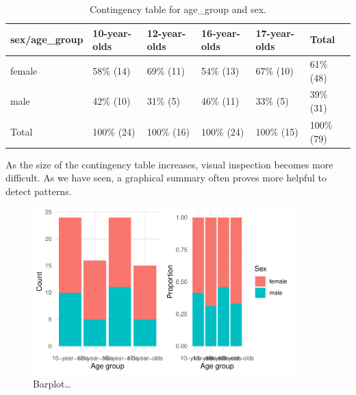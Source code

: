 \documentclass[
  letterpaper,
]{latex/krantz}
\begin{document}
\hypertarget{tbl-summaries-bivariate-categorical-table-belc}{}
\begin{table}
\caption{\label{tbl-summaries-bivariate-categorical-table-belc}Contingency table for age\_group and sex. }\tabularnewline

\centering
\begin{tabular}{llllll}
\toprule
sex/age\_group & 10-year-olds & 12-year-olds & 16-year-olds & 17-year-olds & Total\\
\midrule
female & 58\% (14) & 69\% (11) & 54\% (13) & 67\% (10) & 61\% (48)\\
male & 42\% (10) & 31\%  (5) & 46\% (11) & 33\%  (5) & 39\% (31)\\
Total & 100\% (24) & 100\% (16) & 100\% (24) & 100\% (15) & 100\% (79)\\
\bottomrule
\end{tabular}
\end{table}

As the size of the contingency table increases, visual inspection
becomes more difficult. As we have seen, a graphical summary often
proves more helpful to detect patterns.

\begin{figure}[h]

{\centering \includegraphics[width=0.9\textwidth,height=\textheight]{./approaching-analysis_files/figure-pdf/fig-summaries-bivariate-categorical-barplot-belc-1.pdf}

}

\caption{\label{fig-summaries-bivariate-categorical-barplot-belc}Barplot\ldots{}}

\end{figure}
\end{document}

